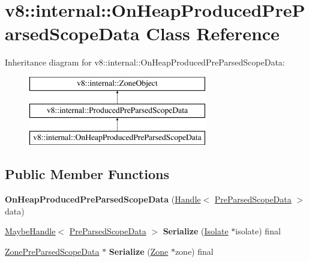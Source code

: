 \hypertarget{classv8_1_1internal_1_1OnHeapProducedPreParsedScopeData}{}\section{v8\+:\+:internal\+:\+:On\+Heap\+Produced\+Pre\+Parsed\+Scope\+Data Class Reference}
\label{classv8_1_1internal_1_1OnHeapProducedPreParsedScopeData}
Inheritance diagram for v8\+:\+:internal\+:\+:On\+Heap\+Produced\+Pre\+Parsed\+Scope\+Data\+:\begin{figure}[H]
\begin{center}
\leavevmode
\includegraphics[height=3.000000cm]{classv8_1_1internal_1_1OnHeapProducedPreParsedScopeData}
\end{center}
\end{figure}
\subsection*{Public Member Functions}
\begin{DoxyCompactItemize}
\item 
\mbox{\label{classv8_1_1internal_1_1OnHeapProducedPreParsedScopeData_a0abcc6bed34af300dcd7dfaa1180e0dc}} 
{\bfseries On\+Heap\+Produced\+Pre\+Parsed\+Scope\+Data} (\mbox{\hyperlink{classv8_1_1internal_1_1Handle}{Handle}}$<$ \mbox{\hyperlink{classv8_1_1internal_1_1PreParsedScopeData}{Pre\+Parsed\+Scope\+Data}} $>$ data)
\item 
\mbox{\label{classv8_1_1internal_1_1OnHeapProducedPreParsedScopeData_a823c5c5806251352059ca6f1add87019}} 
\mbox{\hyperlink{classv8_1_1internal_1_1MaybeHandle}{Maybe\+Handle}}$<$ \mbox{\hyperlink{classv8_1_1internal_1_1PreParsedScopeData}{Pre\+Parsed\+Scope\+Data}} $>$ {\bfseries Serialize} (\mbox{\hyperlink{classv8_1_1internal_1_1Isolate}{Isolate}} $\ast$isolate) final
\item 
\mbox{\label{classv8_1_1internal_1_1OnHeapProducedPreParsedScopeData_aa4dbebdbaaca81f286afe4869cb42930}} 
\mbox{\hyperlink{classv8_1_1internal_1_1ZonePreParsedScopeData}{Zone\+Pre\+Parsed\+Scope\+Data}} $\ast$ {\bfseries Serialize} (\mbox{\hyperlink{classv8_1_1internal_1_1Zone}{Zone}} $\ast$zone) final
\end{DoxyCompactItemize}
